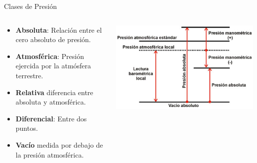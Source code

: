 \documentclass[aspectratio=169]{beamer}
\begin{document}
\begin{frame}{Clases de Presión}
    \begin{columns}[c, onlytextwidth]
        \begin{column}{0.45\textwidth}
            \begin{itemize}
                \item \textbf{Absoluta}: Relación entre el cero absoluto de presión. 
                \item \textbf{Atmosférica}: Presión ejercida por la atmósfera terrestre. 
                \item \textbf{Relativa} diferencia entre absoluta y atmosférica. 
                \item \textbf{Diferencial}: Entre dos puntos.
                \item \textbf{Vacío} medida por debajo de la presión atmosférica.
            \end{itemize}
        \end{column}
        \begin{column}{0.50\textwidth}
            \includegraphics[width = 1.1\linewidth]{fig/Presion/Tipos.PNG}
        \end{column}
    \end{columns}
\end{frame}
\end{document}
